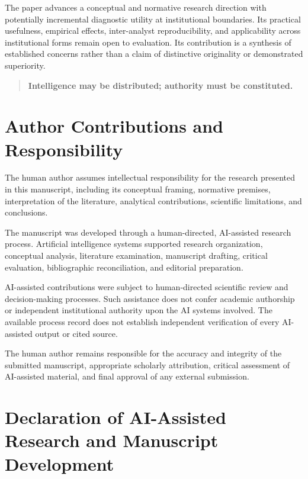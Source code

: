 \documentclass[
  10pt,
]{article}
\begin{document}
The paper advances a conceptual and normative research direction with
potentially incremental diagnostic utility at institutional boundaries.
Its practical usefulness, empirical effects, inter-analyst
reproducibility, and applicability across institutional forms remain
open to evaluation. Its contribution is a synthesis of established
concerns rather than a claim of distinctive originality or demonstrated
superiority.

\begin{quote}
\textbf{Intelligence may be distributed; authority must be constituted.}
\end{quote}

\section{Author Contributions and
Responsibility}\label{author-contributions-and-responsibility}

The human author assumes intellectual responsibility for the research
presented in this manuscript, including its conceptual framing,
normative premises, interpretation of the literature, analytical
contributions, scientific limitations, and conclusions.

The manuscript was developed through a human-directed, AI-assisted
research process. Artificial intelligence systems supported research
organization, conceptual analysis, literature examination, manuscript
drafting, critical evaluation, bibliographic reconciliation, and
editorial preparation.

AI-assisted contributions were subject to human-directed scientific
review and decision-making processes. Such assistance does not confer
academic authorship or independent institutional authority upon the AI
systems involved. The available process record does not establish
independent verification of every AI-assisted output or cited source.

The human author remains responsible for the accuracy and integrity of
the submitted manuscript, appropriate scholarly attribution, critical
assessment of AI-assisted material, and final approval of any external
submission.

\section{Declaration of AI-Assisted Research and Manuscript
Development}\label{declaration-of-ai-assisted-research-and-manuscript-development}
\end{document}
